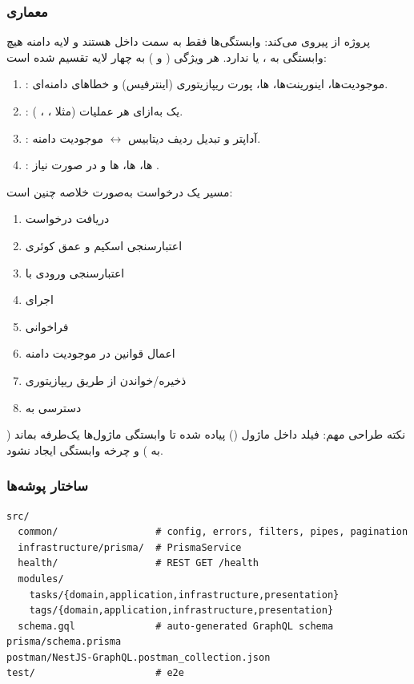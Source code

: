 \subsubsection*{معماری}

پروژه از {} پیروی می‌کند: وابستگی‌ها فقط به سمت داخل هستند و لایه دامنه هیچ وابستگی به ،  یا  ندارد. هر ویژگی ( و ) به چهار لایه تقسیم شده است:

\begin{enumerate}
    \item {:} موجودیت‌ها، اینورینت‌ها، ها، پورت ریپازیتوری (اینترفیس) و خطاهای دامنه‌ای.
    \item {:} یک  به‌ازای هر عملیات (مثلا ، ، ).
    \item {:} آداپتر  و  تبدیل ردیف دیتابیس $\leftrightarrow$ موجودیت دامنه.
    \item {:} ها، ها، ها و در صورت نیاز .
\end{enumerate}

مسیر یک درخواست به‌صورت خلاصه چنین است:
\begin{enumerate}
    \item دریافت درخواست 
    \item اعتبارسنجی اسکیم و عمق کوئری
    \item اعتبارسنجی ورودی با 
    \item اجرای 
    \item فراخوانی 
    \item اعمال قوانین در موجودیت دامنه
    \item ذخیره/خواندن از طریق ریپازیتوری 
    \item دسترسی به 
\end{enumerate}

نکته طراحی مهم: فیلد  داخل ماژول  () پیاده شده تا وابستگی ماژول‌ها یک‌طرفه بماند ( به ) و چرخه وابستگی ایجاد نشود.

\subsubsection*{ ساختار پوشه‌ها}

\begin{latin}
\begin{lstlisting}[language={},basicstyle=\ttfamily\footnotesize]
src/
  common/                 # config, errors, filters, pipes, pagination
  infrastructure/prisma/  # PrismaService
  health/                 # REST GET /health
  modules/
    tasks/{domain,application,infrastructure,presentation}
    tags/{domain,application,infrastructure,presentation}
  schema.gql              # auto-generated GraphQL schema
prisma/schema.prisma
postman/NestJS-GraphQL.postman_collection.json
test/                     # e2e
\end{lstlisting}
\end{latin}

